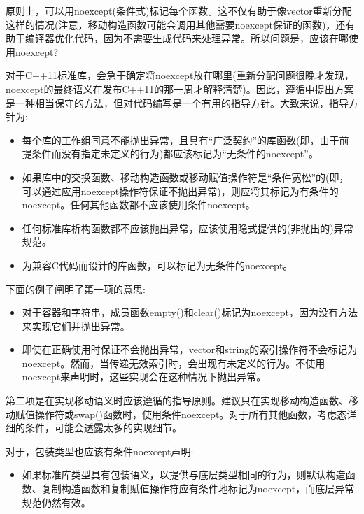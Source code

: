 原则上，可以用noexcept(条件式)标记每个函数。这不仅有助于像vector重新分配这样的情况(注意，移动构造函数可能会调用其他需要noexcept保证的函数)，还有助于编译器优化代码，因为不需要生成代码来处理异常。所以问题是，应该在哪使用noexcept?\par

对于C++11标准库，会急于确定将noexcept放在哪里(重新分配问题很晚才发现，noexcept的最终语义在发布C++11的那一周才解释清楚)。因此，遵循中提出方案是一种相当保守的方法，但对代码编写是一个有用的指导方针。大致来说，指导方针为:\par

\begin{itemize}
  \item 每个库的工作组同意不能抛出异常，且具有“广泛契约”的库函数(即，由于前提条件而没有指定未定义的行为)都应该标记为“无条件的noexcept”。
  \item 如果库中的交换函数、移动构造函数或移动赋值操作符是“条件宽松”的(即，可以通过应用noexcept操作符保证不抛出异常)，则应将其标记为有条件的noexcept。任何其他函数都不应该使用条件noexcept。
  \item 任何标准库析构函数都不应该抛出异常，应该使用隐式提供的(非抛出的)异常规范。
  \item 为兼容C代码而设计的库函数，可以标记为无条件的noexcept。
\end{itemize}

下面的例子阐明了第一项的意思:\par

\begin{itemize}
  \item 对于容器和字符串，成员函数empty()和clear()标记为noexcept，因为没有方法来实现它们并抛出异常。
  \item 即使在正确使用时保证不会抛出异常，vector和string的索引操作符不会标记为noexcept。然而，当传递无效索引时，会出现有未定义的行为。不使用noexcept来声明时，这些实现会在这种情况下抛出异常。
\end{itemize}

第二项是在实现移动语义时应该遵循的指导原则。建议只在实现移动构造函数、移动赋值操作符或swap()函数时，使用条件noexcept。对于所有其他函数，考虑态详细的条件，可能会透露太多的实现细节。\par

对于，包装类型也应该有条件noexcept声明:\par

\begin{itemize}
  \item 如果标准库类型具有包装语义，以提供与底层类型相同的行为，则默认构造函数、复制构造函数和复制赋值操作符应有条件地标记为noexcept，而底层异常规范仍然有效。
\end{itemize}

